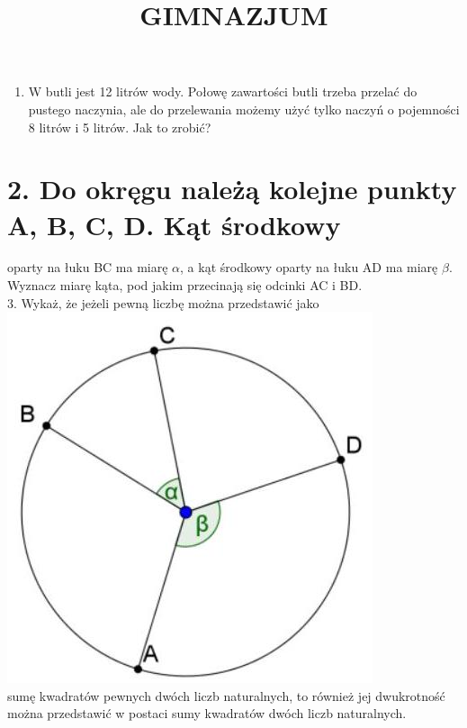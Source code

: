 \documentclass[10pt]{article}
\title{GIMNAZJUM }
\author{}
\date{}
\begin{document}
\maketitle
\begin{enumerate}
  \item W butli jest 12 litrów wody. Połowę zawartości butli trzeba przelać do pustego naczynia, ale do przelewania możemy użyć tylko naczyń o pojemności 8 litrów i 5 litrów. Jak to zrobić?
\end{enumerate}

\section*{2. Do okręgu należą kolejne punkty A, B, C, D. Kąt środkowy}
oparty na łuku BC ma miarę \(\alpha\), a kąt środkowy oparty na łuku AD ma miarę \(\beta\). Wyznacz miarę kąta, pod jakim przecinają się odcinki AC i BD.\\
3. Wykaż, że jeżeli pewną liczbę można przedstawić jako\\
\includegraphics[max width=\textwidth, center]{2024_11_21_8d452c3074d21c805645g-1}\\
sumę kwadratów pewnych dwóch liczb naturalnych, to również jej dwukrotność można przedstawić w postaci sumy kwadratów dwóch liczb naturalnych.
\end{document}
